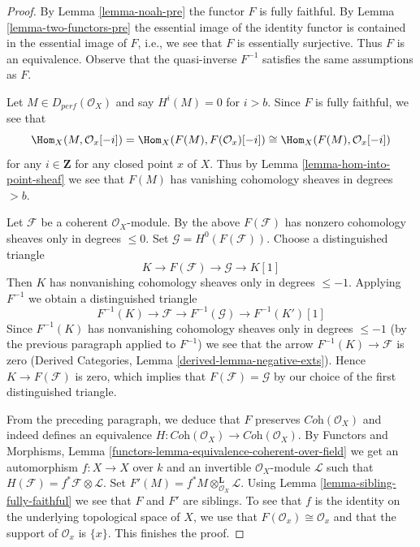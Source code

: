 \begin{proof}
By Lemma \ref{lemma-noah-pre} the functor $F$ is fully faithful.
By Lemma \ref{lemma-two-functors-pre} the essential image of
the identity functor is contained in the essential image of $F$, i.e.,
we see that $F$ is essentially surjective. Thus $F$ is an equivalence.
Observe that the quasi-inverse $F^{-1}$ satisfies the same assumptions
as $F$.

\medskip\noindent
Let $M \in D_{perf}(\mathcal{O}_X)$ and say $H^i(M) = 0$ for $i > b$.
Since $F$ is fully faithful, we see that
$$
\Hom_X(M, \mathcal{O}_x[-i]) =
\Hom_X(F(M), F(\mathcal{O}_x)[-i]) \cong
\Hom_X(F(M), \mathcal{O}_x[-i])
$$
for any $i \in \mathbf{Z}$ for any closed point $x$ of $X$.
Thus by Lemma \ref{lemma-hom-into-point-sheaf} we see that $F(M)$
has vanishing cohomology sheaves in degrees $> b$.

\medskip\noindent
Let $\mathcal{F}$ be a coherent $\mathcal{O}_X$-module. By
the above $F(\mathcal{F})$ has nonzero cohomology sheaves
only in degrees $\leq 0$.
Set $\mathcal{G} = H^0(F(\mathcal{F}))$. Choose a distinguished
triangle
$$
K \to F(\mathcal{F}) \to \mathcal{G} \to K[1]
$$
Then $K$ has nonvanishing cohomology sheaves only in
degrees $\leq -1$.
Applying $F^{-1}$ we obtain a distinguished triangle
$$
F^{-1}(K) \to \mathcal{F} \to F^{-1}(\mathcal{G}) \to F^{-1}(K')[1]
$$
Since $F^{-1}(K)$ has nonvanishing cohomology sheaves only
in degrees $\leq -1$ (by the previous paragraph applied to $F^{-1}$)
we see that the arrow $F^{-1}(K) \to \mathcal{F}$ is zero
(Derived Categories, Lemma \ref{derived-lemma-negative-exts}).
Hence $K \to F(\mathcal{F})$ is zero, which implies
that $F(\mathcal{F}) = \mathcal{G}$ by our choice of the
first distinguished triangle.

\medskip\noindent
From the preceding paragraph, we deduce that $F$ preserves
$\textit{Coh}(\mathcal{O}_X)$ and indeed defines an equivalence
$H : \textit{Coh}(\mathcal{O}_X) \to \textit{Coh}(\mathcal{O}_X)$.
By Functors and Morphisms, Lemma
\ref{functors-lemma-equivalence-coherent-over-field}
we get an automorphism $f : X \to X$ over $k$
and an invertible $\mathcal{O}_X$-module $\mathcal{L}$
such that $H(\mathcal{F}) = f^*\mathcal{F} \otimes \mathcal{L}$.
Set $F'(M) = f^*M \otimes_{\mathcal{O}_X}^\mathbf{L} \mathcal{L}$.
Using Lemma \ref{lemma-sibling-fully-faithful}
we see that $F$ and $F'$ are siblings.
To see that $f$ is the identity on the underlying topological
space of $X$, we use that $F(\mathcal{O}_x) \cong \mathcal{O}_x$
and that the support of $\mathcal{O}_x$ is $\{x\}$.
This finishes the proof.
\end{proof}

